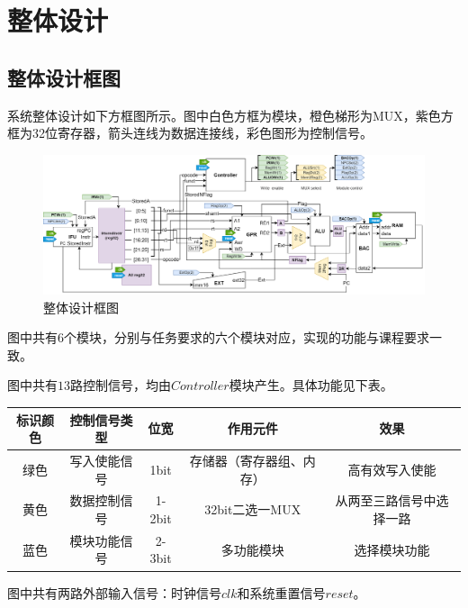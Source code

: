 \documentclass[main.tex]{subfiles}
\begin{document}
\section{整体设计}
\subsection{整体设计框图}
系统整体设计如下方框图所示。图中白色方框为模块，橙色梯形为MUX，紫色方框为32位寄存器，箭头连线为数据连接线，彩色图形为控制信号。
\begin{figure}[h]
\centering
\includegraphics[width=\textwidth]{images/PCOCD-P2-overall-block.png}
\caption{整体设计框图}
\end{figure}

图中共有$6$个模块，分别与任务要求的六个模块对应，实现的功能与课程要求一致。

图中共有$13$路控制信号，均由$Controller$模块产生。具体功能见下表。

\begin{center}
    \begin{tabular}{c c c c c}
        \toprule
        标识颜色 & 控制信号类型 & 位宽 & 作用元件 & 效果\\
        \midrule
         绿色 & 写入使能信号 & 1bit & 存储器（寄存器组、内存） & 高有效写入使能 \\
         黄色 & 数据控制信号 & 1-2bit & 32bit二选一MUX & 从两至三路信号中选择一路 \\
         蓝色 & 模块功能信号 & 2-3bit & 多功能模块 & 选择模块功能 \\
        \bottomrule
    \end{tabular}
\end{center}

图中共有两路外部输入信号：时钟信号$clk$和系统重置信号$reset$。

\clearpage

\begin{figure}[h]
\end{figure}
\clearpage
\end{document}
